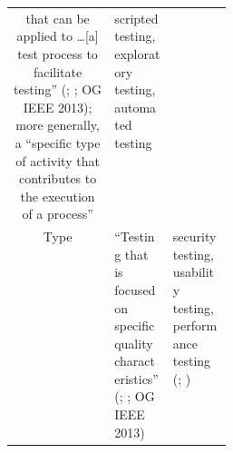 \begin{table}[hbtp!]
\begin{tabularx}{\linewidth}{|c|X|m{0.275\linewidth}|}
        that can be applied to \dots [a] test process to facilitate testing''
        (\citealp[p.~14]{IEEE2022}; \citealp[p.~471]{IEEE2017}; OG IEEE 2013);
        more generally, a ``specific type of activity
        that contributes to the execution of a process''
        \citep[p.~331]{IEEE2017}          & scripted testing,
        exploratory testing, automated testing \citep[p.~20]{IEEE2022}                                 \\
        Type                              & ``Testing that is focused
        on specific quality characteristics''
        (\citealp[p.~15]{IEEE2022}; \citealp[p.~473]{IEEE2017};
        OG IEEE 2013)                     & security testing, usability testing,
        performance testing (\citealp[p.~15]{IEEE2022};
        \citealp[p.~473]{IEEE2017})                                                                    \\
        \hline
    \end{tabularx}
\end{table}
